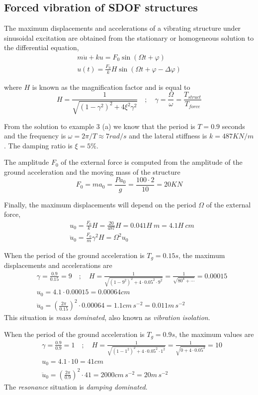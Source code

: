\subsection{Forced vibration of SDOF structures}


The maximum displacements and accelerations of a vibrating structure under sinusoidal excitation are obtained from the stationary or homogeneous solution to the differential equation,
\begin{align*}
m\ddot{u} + ku = F_0\sin(\Omega t + \varphi) \\
u(t) = \frac{F_0}{k}H\sin(\Omega t + \varphi - \Delta\varphi)
\end{align*}

where $H$ is known as the magnification factor and is equal to
$$
H = \frac{1}{\sqrt{(1-\gamma^2)^2 + 4\xi^2\gamma^2}} \quad ; \quad
\gamma = \frac{\Omega}{\omega} = \frac{T_{struct}}{T_{force}}
$$

From the solution to example 3 (a) we know that the period is $T=0.9$ seconds and the frequency is $\omega = 2\pi/T \approx 7rad/s$ and the lateral stiffness is $k=487KN/m$. The damping ratio is $\xi=5\%$.

The amplitude $F_0$ of the external force is computed from the amplitude of the ground acceleration and the moving mass of the structure
$$
F_0 = ma_{0} = \frac{Pa_0}{g} = \frac{100\cdot2}{10} = 20KN
$$

Finally, the maximum displacements will depend on the period $\Omega$ of the external force,
\begin{align*}
&u_0 = \frac{F_0}{k}H = \frac{20}{487}H = 0.041H\ m = 4.1H\ cm \\
&\ddot{u}_0 = \frac{F_0}{m}\gamma^2H = \Omega^2u_0
\end{align*}


When the period of the ground acceleration is $T_g=0.15s$, the maximum displacements and accelerations are
\begin{align*}
&\gamma = \frac{0.9}{0.15} = 9 \quad ; \quad
H = \frac{1}{\sqrt{(1-9^2)^2 + 4\cdot 0.05^2\cdot 9^2}} = \frac{1}{\sqrt{80^4 + \cdots}} = 0.00015 \\
&u_0 = 4.1\cdot 0.00015 = 0.00064 cm \\
&\ddot{u}_0 = \left(\frac{2\pi}{0.15}\right)^2 \cdot 0.00064 = 1.1cm\,s^{-2} = 0.011m\,s^{-2}
\end{align*}
This situation is \emph{mass dominated}, also known as \emph{vibration isolation}.

When the period of the ground acceleration is $T_g=0.9s$, the maximum values are
\begin{align*}
&\gamma = \frac{0.9}{0.9} = 1 \quad ; \quad
H = \frac{1}{\sqrt{(1-1^2)^2 + 4\cdot 0.05^2\cdot 1^2}} = \frac{1}{\sqrt{0 + 4\cdot 0.05^2}} = 10 \\
&u_0 = 4.1\cdot 10 = 41 cm \\
&\ddot{u}_0 = \left(\frac{2\pi}{0.9}\right)^2 \cdot 41 = 2000cm\,s^{-2} = 20m\,s^{-2}
\end{align*}
The \emph{resonance} situation is \emph{damping dominated}.

